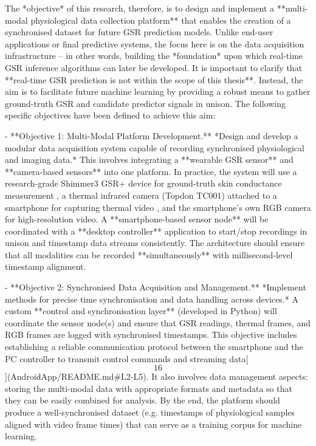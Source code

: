 \documentclass[12pt,a4paper]{article}
\begin{document}
The *objective* of this research, therefore, is to design and implement
a **multi-modal physiological data collection platform** that enables
the creation of a synchronised dataset for future GSR prediction models.
Unlike end-user applications or final predictive systems, the focus here
is on the data acquisition infrastructure -- in other words, building
the *foundation* upon which real-time GSR inference algorithms can later
be developed. It is important to clarify that **real-time GSR prediction
is not within the scope of this thesis**. Instead, the aim is to
facilitate future machine learning by providing a robust means to gather
ground-truth GSR and candidate predictor signals in unison. The
following specific objectives have been defined to achieve this aim:

- **Objective 1: Multi-Modal Platform Development.** *Design and develop
  a modular data acquisition system capable of recording synchronised
  physiological and imaging data.* This involves integrating a
  **wearable GSR sensor** and **camera-based sensors** into one
  platform. In practice, the system will use a research-grade Shimmer3
  GSR+ device for ground-truth skin conductance
  measurement \citep{ShimmerGSRSpecs},
  a thermal infrared camera (Topdon TC001) attached to a smartphone for
  capturing thermal
  video \citep{TopdonTC001Specs},
  and the smartphone's own RGB camera for high-resolution video. A
  **smartphone-based sensor node** will be coordinated with a **desktop
  controller** application to start/stop recordings in unison and
  timestamp data streams consistently. The architecture should ensure
  that all modalities can be recorded **simultaneously** with
  millisecond-level timestamp alignment.

- **Objective 2: Synchronised Data Acquisition and Management.**
  *Implement methods for precise time synchronisation and data handling
  across devices.* A custom **control and synchronisation layer**
  (developed in Python) will coordinate the sensor node(s) and ensure
  that GSR readings, thermal frames, and RGB frames are logged with
  synchronised timestamps. This objective includes establishing a
  reliable communication protocol between the smartphone and the PC
  controller to transmit control commands and streaming
  data[\[16\]](AndroidApp/README.md#L2-L5).
  It also involves data management aspects: storing the multi-modal data
  with appropriate formats and metadata so that they can be easily
  combined for analysis. By the end, the platform should produce a
  well-synchronised dataset (e.g. timestamps of physiological samples
  aligned with video frame times) that can serve as a training corpus
  for machine learning.
\end{document}

